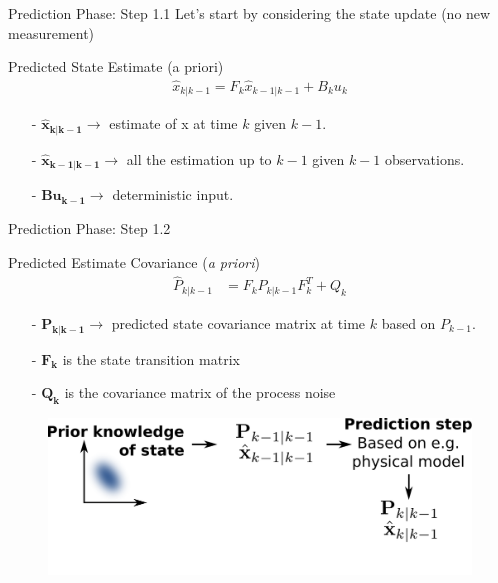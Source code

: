 \documentclass[aspectratio=169,hyperref={pdfpagelabels=false}]{beamer}
\begin{document}
\begin{frame}{Prediction Phase: Step 1.1}
  Let's start by considering the state update (no new measurement)
  \begin{block}{Predicted State Estimate (a priori)}
  \begin{align*}
    \boxed{\hat{x}_{k|k-1} = F_{k} \hat{x}_{k-1|k-1} + B_{k}u_{k}}
  \end{align*}
  \begin{itemize}
    \item[-] $\mathbf{\hat{x}_{k|k-1}} \rightarrow$ estimate of x at time $k$ given $k-1$.
    \item[-] $\mathbf{\hat{x}_{k-1|k-1}} \rightarrow$ all the estimation up to $k-1$ given $k-1$ observations.
    \item[-] $\mathbf{Bu_{k-1}} \rightarrow$ deterministic input.
  \end{itemize}
  \end{block}
\end{frame}


\begin{frame}{Prediction Phase: Step 1.2 }
  
  \begin{block}{Predicted Estimate Covariance (\textit{a priori})}
    \begin{align*}
      \hat{P}_{k|k-1} &= F_{k}P_{k|k-1}F_{k}^T + Q_{k}
      \end{align*}
  \begin{itemize}
    \item[-] $\mathbf{P_{k|k-1}} \rightarrow$ predicted state covariance matrix at time $k$ based on $P_{k-1}$.
    \item[-] $\mathbf{F_{k}}$ is the state transition matrix
    \item[-] $\mathbf{Q_k}$ is the covariance matrix of the process noise
  \end{itemize}
  \end{block}
\end{frame}

\begin{frame}
  \begin{figure}
    \centering
    \includegraphics[width=1\linewidth]{img/4.pdf}
  \end{figure}
\end{frame}
\end{document}
